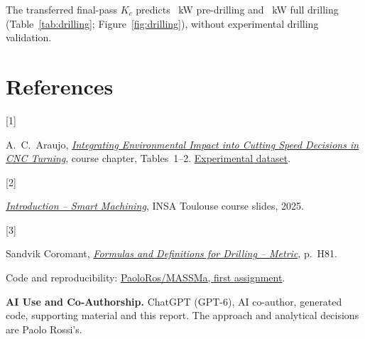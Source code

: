\documentclass[10pt,a4paper]{article}
\begin{document}
The transferred final-pass $K_c$ predicts \PrePower~kW pre-drilling and \DrillPower~kW full drilling (Table~\ref{tab:drilling}; Figure~\ref{fig:drilling}), without experimental drilling validation.

\section*{References}
\hypertarget{source:chapter}{[1]} A.~C.~Araujo, \href{https://github.com/PaoloRos/MASSMa/blob/main/1st_assignment/turning_params.pdf}{\emph{Integrating Environmental Impact into Cutting Speed Decisions in CNC Turning}}, course chapter, Tables~1--2. \href{https://github.com/annacarlaaraujo/chapter_2025}{Experimental dataset}.\par
\hypertarget{source:slides}{[2]} \href{run:sources/introduction_smart_machining_2025.pdf}{\emph{Introduction -- Smart Machining}}, INSA Toulouse course slides, 2025.\par
\hypertarget{source:sandvik}{[3]} Sandvik Coromant, \href{https://cdn.sandvik.coromant.com/files/sitecollectiondocuments/services/metal-cutting-e-learning/formulas-and-definitions/formulas-and-deinitions-for-drilling-metric-enu.pdf}{\emph{Formulas and Definitions for Drilling -- Metric}}, p.~H81.\par
Code and reproducibility: \href{https://github.com/PaoloRos/MASSMa/tree/main/1st_assignment}{PaoloRos/MASSMa, first assignment}.
\par\smallskip
\colorbox{pale}{\parbox{\dimexpr\linewidth-2\fboxsep\relax}{
\textbf{\color{navy}AI Use and Co-Authorship.} ChatGPT (GPT-6), AI co-author, generated code, supporting material and this report. The approach and analytical decisions are Paolo Rossi's.}}
\end{document}
